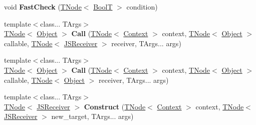 \begin{DoxyCompactItemize}
\item 
\mbox{\label{classv8_1_1internal_1_1CodeStubAssembler_ae48c30b0f2c441a72d83047de24f3e5a}} 
void {\bfseries Fast\+Check} (\mbox{\hyperlink{classv8_1_1internal_1_1compiler_1_1TNode}{T\+Node}}$<$ \mbox{\hyperlink{structv8_1_1internal_1_1BoolT}{BoolT}} $>$ condition)
\item 
\mbox{\label{classv8_1_1internal_1_1CodeStubAssembler_a7a709309bb3a786ad069fa88c6a71b55}} 
{\footnotesize template$<$class... T\+Args$>$ }\\\mbox{\hyperlink{classv8_1_1internal_1_1compiler_1_1TNode}{T\+Node}}$<$ \mbox{\hyperlink{classv8_1_1internal_1_1Object}{Object}} $>$ {\bfseries Call} (\mbox{\hyperlink{classv8_1_1internal_1_1compiler_1_1TNode}{T\+Node}}$<$ \mbox{\hyperlink{classv8_1_1internal_1_1Context}{Context}} $>$ context, \mbox{\hyperlink{classv8_1_1internal_1_1compiler_1_1TNode}{T\+Node}}$<$ \mbox{\hyperlink{classv8_1_1internal_1_1Object}{Object}} $>$ callable, \mbox{\hyperlink{classv8_1_1internal_1_1compiler_1_1TNode}{T\+Node}}$<$ \mbox{\hyperlink{classv8_1_1internal_1_1JSReceiver}{J\+S\+Receiver}} $>$ receiver, T\+Args... args)
\item 
\mbox{\label{classv8_1_1internal_1_1CodeStubAssembler_a6ab7889fac1a188ec2e4af2e2a6b56e3}} 
{\footnotesize template$<$class... T\+Args$>$ }\\\mbox{\hyperlink{classv8_1_1internal_1_1compiler_1_1TNode}{T\+Node}}$<$ \mbox{\hyperlink{classv8_1_1internal_1_1Object}{Object}} $>$ {\bfseries Call} (\mbox{\hyperlink{classv8_1_1internal_1_1compiler_1_1TNode}{T\+Node}}$<$ \mbox{\hyperlink{classv8_1_1internal_1_1Context}{Context}} $>$ context, \mbox{\hyperlink{classv8_1_1internal_1_1compiler_1_1TNode}{T\+Node}}$<$ \mbox{\hyperlink{classv8_1_1internal_1_1Object}{Object}} $>$ callable, \mbox{\hyperlink{classv8_1_1internal_1_1compiler_1_1TNode}{T\+Node}}$<$ \mbox{\hyperlink{classv8_1_1internal_1_1Object}{Object}} $>$ receiver, T\+Args... args)
\item 
\mbox{\label{classv8_1_1internal_1_1CodeStubAssembler_a30046ddd3f07600596b6aaefbeb9abfa}} 
{\footnotesize template$<$class... T\+Args$>$ }\\\mbox{\hyperlink{classv8_1_1internal_1_1compiler_1_1TNode}{T\+Node}}$<$ \mbox{\hyperlink{classv8_1_1internal_1_1JSReceiver}{J\+S\+Receiver}} $>$ {\bfseries Construct} (\mbox{\hyperlink{classv8_1_1internal_1_1compiler_1_1TNode}{T\+Node}}$<$ \mbox{\hyperlink{classv8_1_1internal_1_1Context}{Context}} $>$ context, \mbox{\hyperlink{classv8_1_1internal_1_1compiler_1_1TNode}{T\+Node}}$<$ \mbox{\hyperlink{classv8_1_1internal_1_1JSReceiver}{J\+S\+Receiver}} $>$ new\+\_\+target, T\+Args... args)

\end{DoxyCompactItemize}
